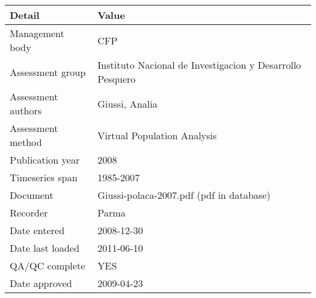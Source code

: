 \begin{table}[htb]
\centering
\begin{tabular}{lp{7cm}}
\toprule
Detail & Value \\
\midrule
Management body    & CFP                                                       \\
Assessment group   & Instituto Nacional de Investigacion y Desarrollo Pesquero \\
Assessment authors & Giussi, Analia                                            \\
Assessment method  & Virtual Population Analysis                               \\
Publication year   & 2008                                                      \\
Timeseries span    & 1985-2007                                                 \\
Document           & Giussi-polaca-2007.pdf (pdf in database)                  \\
Recorder           & Parma                                                     \\
Date entered       & 2008-12-30                                                \\
Date last loaded   & 2011-06-10                                                \\
QA/QC complete     & YES                                                       \\
Date approved      & 2009-04-23                                                \\
\bottomrule
\end{tabular}
\label{tab:assessdet}
\end{table}
